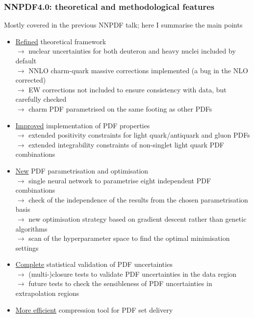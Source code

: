 \documentclass{beamer}
\begin{document}
\begin{frame}
 \frametitle{NNPDF4.0: theoretical and methodological features}
 \footnotesize
 \centering
 \begin{block}{}
  \centering
  Mostly covered in the previous NNPDF talk; here I summarise the main points\\
 \end{block}
 \begin{itemize}
  \item \underline{Refined} theoretical framework\\
  {\scriptsize $\rightarrow$ nuclear uncertainties for both deuteron and heavy nuclei included by default}\\
  {\scriptsize $\rightarrow$ NNLO charm-quark massive corrections implemented (a bug in the NLO corrected)}\\
  {\scriptsize $\rightarrow$ EW corrections not included to ensure consistency with data, but carefully checked}\\  
  {\scriptsize $\rightarrow$ charm PDF parametrised on the same footing as other PDFs}\\
  \item \underline{Improved} implementation of PDF properties\\
  {\scriptsize $\rightarrow$ extended positivity constraints for light quark/antiquark and gluon PDFs}\\
  {\scriptsize $\rightarrow$ extended integrability constraints of non-singlet light quark PDF combinations}\\
  \item \underline{New} PDF parametrisation and optimisation \\
  {\scriptsize $\rightarrow$ single neural network to parametrise eight independent PDF combinations}\\
  {\scriptsize $\rightarrow$ check of the independence of the results from the chosen parametrisation basis}\\
  {\scriptsize $\rightarrow$ new optimisation strategy based on gradient descent rather than genetic algorithms}\\
  {\scriptsize $\rightarrow$ scan of the hyperparameter space to find the optimal minimisation settings}\\
  \item \underline{Complete} statistical validation of PDF uncertainties\\
  {\scriptsize $\rightarrow$ (multi-)closure tests to validate PDF uncertainties in the data region}\\
  {\scriptsize $\rightarrow$ future tests to check the sensibleness of PDF uncertainties in extrapolation regions}\\
  \item \underline{More efficient} compression tool for PDF set delivery 
 \end{itemize}
\end{frame}
\end{document}
